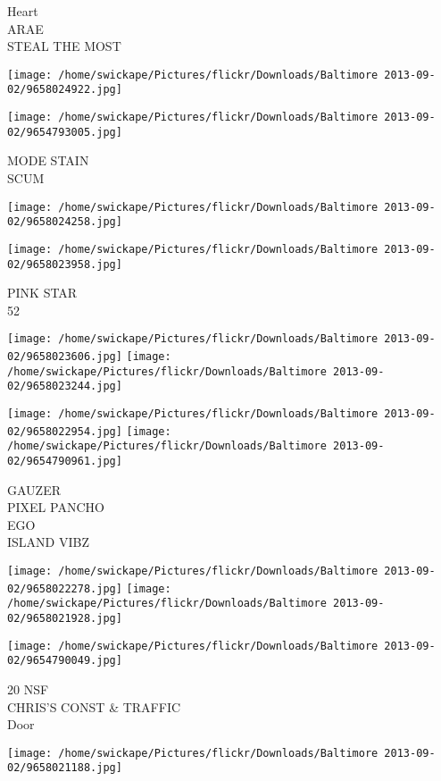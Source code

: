 \documentclass[10pt,letterpaper]{article}
\begin{document}
Heart\\
ARAE\\
STEAL THE MOST
\pagebreak

\texttt{[image: /home/swickape/Pictures/flickr/Downloads/Baltimore 2013-09-02/9658024922.jpg]}

\vspace{0.25in}
\texttt{[image: /home/swickape/Pictures/flickr/Downloads/Baltimore 2013-09-02/9654793005.jpg]}

MODE STAIN\\
SCUM
\pagebreak

\texttt{[image: /home/swickape/Pictures/flickr/Downloads/Baltimore 2013-09-02/9658024258.jpg]}

\vspace{0.25in}
\texttt{[image: /home/swickape/Pictures/flickr/Downloads/Baltimore 2013-09-02/9658023958.jpg]}

PINK STAR\\
52
\pagebreak

\texttt{[image: /home/swickape/Pictures/flickr/Downloads/Baltimore 2013-09-02/9658023606.jpg]}
\texttt{[image: /home/swickape/Pictures/flickr/Downloads/Baltimore 2013-09-02/9658023244.jpg]}

\texttt{[image: /home/swickape/Pictures/flickr/Downloads/Baltimore 2013-09-02/9658022954.jpg]}
\texttt{[image: /home/swickape/Pictures/flickr/Downloads/Baltimore 2013-09-02/9654790961.jpg]}

GAUZER\\
PIXEL PANCHO\\
EGO\\
ISLAND VIBZ
\pagebreak

\texttt{[image: /home/swickape/Pictures/flickr/Downloads/Baltimore 2013-09-02/9658022278.jpg]}
\texttt{[image: /home/swickape/Pictures/flickr/Downloads/Baltimore 2013-09-02/9658021928.jpg]}

\texttt{[image: /home/swickape/Pictures/flickr/Downloads/Baltimore 2013-09-02/9654790049.jpg]}

20 NSF\\
CHRIS'S CONST \& TRAFFIC\\
Door
\pagebreak

\texttt{[image: /home/swickape/Pictures/flickr/Downloads/Baltimore 2013-09-02/9658021188.jpg]}
\end{document}
